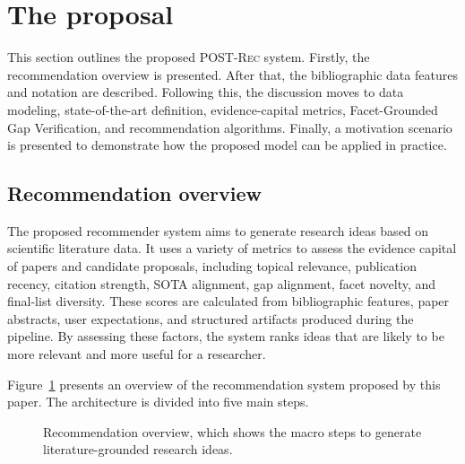 \documentclass[preprint,12pt]{elsarticle}
\begin{document}
\section{The proposal}
\label{sec:proposal}

This section outlines the proposed \textsc{POST-Rec} system. Firstly, the recommendation overview is presented. After that, the bibliographic data features and notation are described. Following this, the discussion moves to data modeling, state-of-the-art definition, evidence-capital metrics, Facet-Grounded Gap Verification, and recommendation algorithms. Finally, a motivation scenario is presented to demonstrate how the proposed model can be applied in practice.

\subsection{Recommendation overview}

The proposed recommender system aims to generate research ideas based on scientific literature data. It uses a variety of metrics to assess the evidence capital of papers and candidate proposals, including topical relevance, publication recency, citation strength, SOTA alignment, gap alignment, facet novelty, and final-list diversity. These scores are calculated from bibliographic features, paper abstracts, user expectations, and structured artifacts produced during the pipeline. By assessing these factors, the system ranks ideas that are likely to be more relevant and more useful for a researcher.

Figure~\ref{fig:pipeline} presents an overview of the recommendation system proposed by this paper. The architecture is divided into five main steps.

\begin{figure}[t]
  \centering
  \caption{Recommendation overview, which shows the macro steps to generate literature-grounded research ideas.}
  \label{fig:pipeline}
\end{figure}
\end{document}
